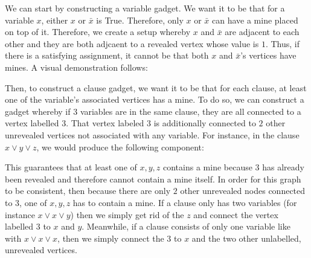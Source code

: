 \documentclass[11pt, reqno]{amsart}
\theoremstyle{plain}
\theoremstyle{definition}
\newcounter{r}
\begin{document}
\begin{enumerate}
    We can start by constructing a variable gadget. We want it to be that for a
    variable $x$, either $x$ or $\bar{x}$ is True. Therefore, only $x$ or
    $\bar{x}$ can have a mine placed on top of it. Therefore, we create a setup
    whereby $x$ and $\bar{x}$ are adjacent to each other and they are both
    adjcaent to a revealed vertex whose value is $1$. Thus, if there is a
    satisfying assignment, it cannot be that both $x$ and $\bar{x}$'s vertices
    have mines. A visual demonstration follows:
    \begin{center}
    \end{center}
    Then, to construct a clause gadget, we want it to be that for each clause,
    at least one of the variable's associated vertices has a mine. To do so, we
    can construct a gadget whereby if $3$ variables are in the same clause,
    they are all connected to a vertex labelled $3$. That vertex labeled $3$ is
    additionally connected to $2$ other unrevealed vertices not associated with
    any variable. For instance, in the clause $x\lor y\lor z$, we would produce
    the following component:
    \begin{center}
    \end{center}
    This guarantees that at least one of $x, y, z$ contains a mine because $3$
    has already been revealed and therefore cannot contain a mine itself. In
    order for this graph to be consistent, then because there are only $2$
    other unrevealed nodes connected to $3$, one of $x, y, z$ has to contain a
    mine. If a clause only has two variables (for instance $x\lor x \lor y$)
    then we simply get rid of the $z$ and connect the vertex labelled $3$ to
    $x$ and $y$. Meanwhile, if a clause consists of only one variable like with
    $x\lor x\lor x$, then we simply connect the $3$ to $x$ and the two other
    unlabelled, unrevealed vertices.


\end{enumerate}
\end{document}
